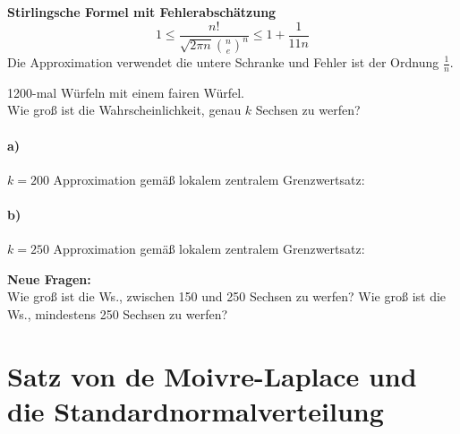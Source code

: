 \begin{erg}
    \textbf{Stirlingsche Formel mit Fehlerabschätzung} 
    \begin{equation}
        1 \leq \frac{n!}{\sqrt{2 \pi n} \binom{n}{e}^n} \leq 1 + \frac{1}{11n}\label{eq:equation}
    \end{equation}
    Die Approximation verwendet die untere Schranke und Fehler ist der Ordnung $\frac{1}{n}$.
\end{erg}
\begin{bsp}
    1200-mal Würfeln mit einem fairen Würfel.  \\
    Wie groß ist die Wahrscheinlichkeit, genau $k$ Sechsen zu werfen?

    \paragraph{a)} $k = 200$
    Approximation gemäß lokalem zentralem Grenzwertsatz:
    \mab{0.030901\dots}

    \paragraph{b)} $k = 250$
    Approximation gemäß lokalem zentralem Grenzwertsatz:
    \mab{0.0000170\dots}
\end{bsp}
\textbf{Neue Fragen:}  \\
Wie groß ist die Ws., zwischen 150 und 250 Sechsen zu werfen?
Wie groß ist die Ws., mindestens 250 Sechsen zu werfen?


\section{Satz von de Moivre-Laplace und die Standardnormalverteilung}

